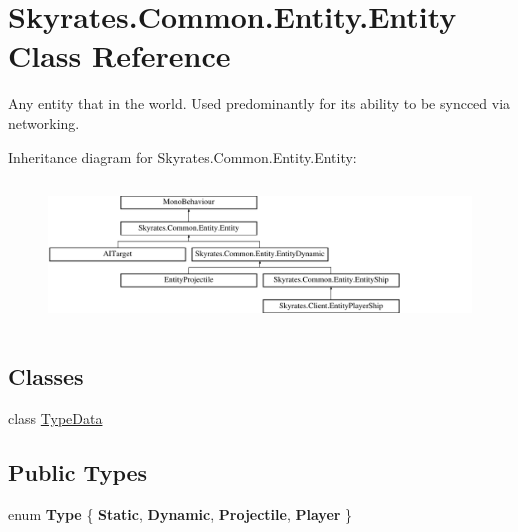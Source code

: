 \hypertarget{class_skyrates_1_1_common_1_1_entity_1_1_entity}{\section{Skyrates.\-Common.\-Entity.\-Entity Class Reference}
\label{class_skyrates_1_1_common_1_1_entity_1_1_entity}
}


Any entity that in the world. Used predominantly for its ability to be syncced via networking.  


Inheritance diagram for Skyrates.\-Common.\-Entity.\-Entity\-:\begin{figure}[H]
\begin{center}
\leavevmode
\includegraphics[height=3.888889cm]{class_skyrates_1_1_common_1_1_entity_1_1_entity}
\end{center}
\end{figure}
\subsection*{Classes}
\begin{DoxyCompactItemize}
\item 
class \hyperlink{class_skyrates_1_1_common_1_1_entity_1_1_entity_1_1_type_data}{Type\-Data}
\end{DoxyCompactItemize}
\subsection*{Public Types}
\begin{DoxyCompactItemize}
\item 
enum {\bfseries Type} \{ {\bfseries Static}, 
{\bfseries Dynamic}, 
{\bfseries Projectile}, 
{\bfseries Player}
 \}
\end{DoxyCompactItemize}
